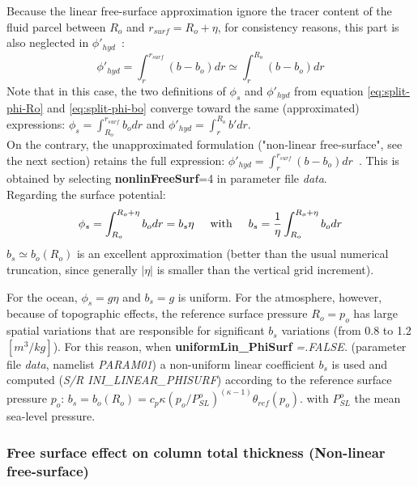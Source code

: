 Because the linear free-surface approximation ignore the tracer content
of the fluid parcel between $R_o$ and $r_{surf}=R_o+\eta$, 
for consistency reasons, this part is also neglected in $\phi'_{hyd}$~:
$$
\phi'_{hyd} = \int^{r_{surf}}_r (b - b_o) dr \simeq \int^{R_o}_r (b - b_o) dr
$$
Note that in this case, the two definitions of $\phi_s$ and $\phi'_{hyd}$ 
from equation \ref{eq:split-phi-Ro} and \ref{eq:split-phi-bo} converge toward 
the same (approximated) expressions: $\phi_s = \int^{r_{surf}}_{R_o} b_o dr$ 
and $\phi'_{hyd}=\int^{R_o}_r b' dr$.\\
On the contrary, the unapproximated formulation ("non-linear free-surface",
see the next section) retains the full expression:
$\phi'_{hyd} = \int^{r_{surf}}_r (b - b_o) dr $~.
This is obtained by selecting {\bf nonlinFreeSurf}=4 in parameter
file {\em data}.\\

Regarding the surface potential: 
$$\phi_s = \int_{R_o}^{R_o+\eta} b_o dr = b_s \eta
\hspace{5mm}\mathrm{with}\hspace{5mm} 
b_s = \frac{1}{\eta} \int_{R_o}^{R_o+\eta} b_o dr $$
$b_s \simeq b_o(R_o)$ is an excellent approximation (better than 
the usual numerical truncation, since generally $|\eta|$ is smaller 
than the vertical grid increment).

For the ocean, $\phi_s = g \eta$ and $b_s = g$ is uniform.
For the atmosphere, however, because of topographic effects, the
reference surface pressure $R_o=p_o$ has large spatial variations that
are responsible for significant $b_s$ variations (from 0.8 to 1.2
$[m^3/kg]$). For this reason, when {\bf uniformLin\_PhiSurf} {\em=.FALSE.} 
(parameter file {\em data}, namelist {\em PARAM01})
a non-uniform linear coefficient $b_s$ is used and computed
({\it S/R INI\_LINEAR\_PHISURF}) according to the reference surface 
pressure $p_o$:
$b_s = b_o(R_o) = c_p \kappa (p_o / P^o_{SL})^{(\kappa - 1)} \theta_{ref}(p_o)$.
with $P^o_{SL}$ the mean sea-level pressure.


\subsubsection{Free surface effect on column total thickness
(Non-linear free-surface)}

